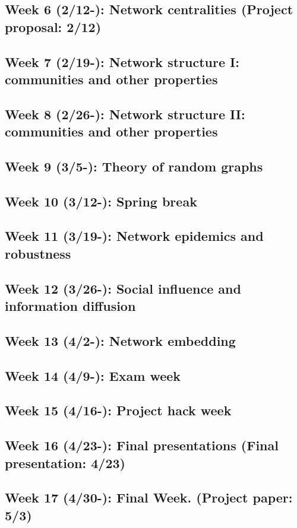 \documentclass[11pt,article,oneside]{memoir} %
\begin{document}
\subsection{Week 6 (2/12-):  Network centralities (Project proposal: 2/12)}
\subsection{Week 7 (2/19-):  Network structure I: communities and other properties}
\subsection{Week 8 (2/26-):  Network structure II: communities and other properties}
\subsection{Week 9 (3/5-):  Theory of random graphs}
\subsection{\color{gray}Week 10 (3/12-): Spring break}
\subsection{Week 11 (3/19-): Network epidemics and robustness}
\subsection{Week 12 (3/26-): Social influence and information diffusion}
\subsection{Week 13 (4/2-): Network embedding}
\subsection{Week 14 (4/9-): Exam week}
\subsection{Week 15 (4/16-): Project hack week}
\subsection{Week 16 (4/23-): Final presentations (Final presentation: 4/23)}
\subsection{Week 17 (4/30-): Final Week. (Project paper: 5/3)}

\end{document}
